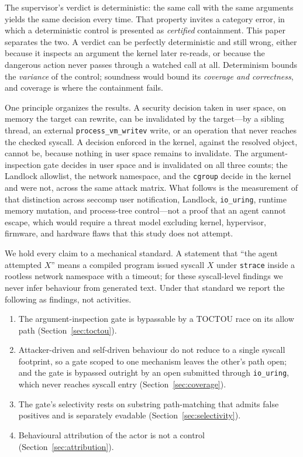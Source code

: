 \documentclass[11pt]{article}
\begin{document}
The supervisor's verdict is deterministic: the same call with the same arguments yields the
same decision every time. That property invites a category error, in which a deterministic
control is presented as \emph{certified} containment. This paper separates the two. A
verdict can be perfectly deterministic and still wrong, either because it inspects an
argument the kernel later re-reads, or because the dangerous action never passes through a
watched call at all. Determinism bounds the \emph{variance} of the control; soundness would
bound its \emph{coverage and correctness}, and coverage is where the containment fails.

One principle organizes the results. A security decision taken in user space, on memory the target can
rewrite, can be invalidated by the target---by a sibling thread, an external \texttt{process\_vm\_writev}
write, or an operation that never reaches the checked syscall. A decision enforced in the kernel, against
the resolved object, cannot be, because nothing in user space remains to invalidate. The
argument-inspection gate decides in user space and is invalidated on all three counts; the Landlock
allowlist, the network namespace, and the \texttt{cgroup} decide in the kernel and were not, across the
same attack matrix. What follows is the measurement of that distinction across seccomp user notification,
Landlock, \texttt{io\_uring}, runtime memory mutation, and process-tree control---not a proof that an
agent cannot escape, which would require a threat model excluding kernel, hypervisor, firmware, and
hardware flaws that this study does not attempt.

We hold every claim to a mechanical standard. A statement that ``the agent attempted $X$''
means a compiled program issued syscall $X$ under \texttt{strace} inside a rootless network
namespace with a timeout; for these syscall-level findings we never infer behaviour from generated
text. Under that standard we report the following as findings, not activities.

\begin{enumerate}[leftmargin=1.4em,itemsep=2pt]
\item The argument-inspection gate is bypassable by a TOCTOU race on its allow path
(Section~\ref{sec:toctou}).
\item Attacker-driven and self-driven behaviour do not reduce to a single syscall footprint, so a
gate scoped to one mechanism leaves the other's path open; and the gate is bypassed outright by an
open submitted through \texttt{io\_uring}, which never reaches syscall entry
(Section~\ref{sec:coverage}).
\item The gate's selectivity rests on substring path-matching that admits false positives and
is separately evadable (Section~\ref{sec:selectivity}).
\item Behavioural attribution of the actor is not a control (Section~\ref{sec:attribution}).
\end{enumerate}
\end{document}
